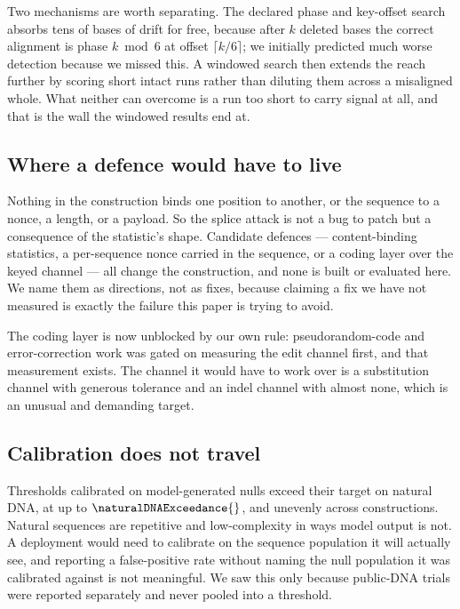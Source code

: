 Two mechanisms are worth separating. The declared phase and key-offset search absorbs tens of bases of
drift for free, because after $k$ deleted bases the correct alignment is phase $k \bmod 6$ at offset
$\lceil k/6 \rceil$; we initially predicted much worse detection because we missed this. A windowed
search then extends the reach further by scoring short intact runs rather than diluting them across a
misaligned whole. What neither can overcome is a run too short to carry signal at all, and that is the
wall the windowed results end at.

\subsection{Where a defence would have to live}

Nothing in the construction binds one position to another, or the sequence to a nonce, a length, or a
payload. So the splice attack is not a bug to patch but a consequence of the statistic's shape.
Candidate defences --- content-binding statistics, a per-sequence nonce carried in the sequence, or a
coding layer over the keyed channel --- all change the construction, and none is built or evaluated
here. We name them as directions, not as fixes, because claiming a fix we have not measured is exactly
the failure this paper is trying to avoid.

The coding layer is now unblocked by our own rule: pseudorandom-code and error-correction work was
gated on measuring the edit channel first, and that measurement exists. The channel it would have to
work over is a substitution channel with generous tolerance and an indel channel with almost none,
which is an unusual and demanding target.

\subsection{Calibration does not travel}

Thresholds calibrated on model-generated nulls exceed their target on natural DNA, at up to
$\naturalDNAExceedance{}$, and unevenly across constructions. Natural sequences are repetitive and
low-complexity in ways model output is not. A deployment would need to calibrate on the sequence
population it will actually see, and reporting a false-positive rate without naming the null population
it was calibrated against is not meaningful. We saw this only because public-DNA trials were reported
separately and never pooled into a threshold.

